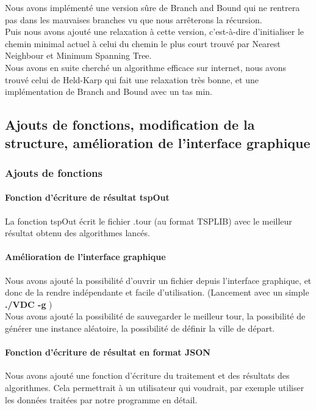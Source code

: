 \documentclass[12pt]{report}
\begin{document}
{{{{{{{Nous avons implémenté une version sûre de Branch and Bound qui ne rentrera pas dans les mauvaises branches vu que nous arrêterons la récursion. \\
Puis nous avons ajouté une relaxation à cette version, c'est-à-dire d'initialiser le chemin minimal actuel à celui du chemin le plus court trouvé par Nearest Neighbour et Minimum Spanning Tree. \\
Nous avons en suite cherché un algorithme efficace sur internet, nous avons trouvé celui de Held-Karp qui fait une relaxation très bonne, et une implémentation de Branch and Bound avec un tas min.

\subsection{Ajouts de fonctions, modification de la structure, amélioration de l'interface graphique}

\subsubsection{Ajouts de fonctions}

\paragraph{Fonction d'écriture de résultat tspOut}

La fonction tspOut écrit le fichier .tour (au format TSPLIB) avec le meilleur résultat obtenu des algorithmes lancés.

\paragraph{Amélioration de l'interface graphique}

Nous avons ajouté la possibilité d'ouvrir un fichier depuis l'interface graphique, et donc de la rendre indépendante et facile d'utilisation. (Lancement avec un simple \textbf{./VDC -g} ) \\
Nous avons ajouté la possibilité de sauvegarder le meilleur tour, la possibilité de générer une instance aléatoire, la possibilité de définir la ville de départ.

\paragraph{Fonction d'écriture de résultat en format JSON}

Nous avons ajouté une fonction d'écriture du traitement et des résultats des algorithmes. Cela permettrait à un utilisateur qui voudrait, par exemple utiliser les données traitées par notre programme en détail.

}}}}}}}
\end{document}
